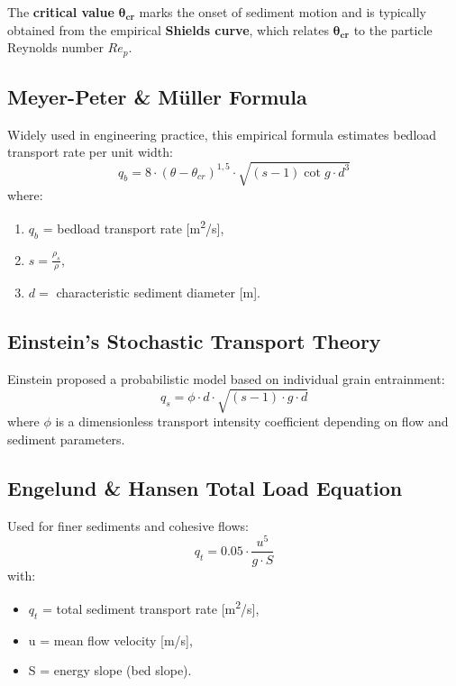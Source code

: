 \documentclass[Journal,letterpaper]{ascelike-new}
\begin{document}
The \textbf{critical value }${\boldsymbol{\theta }}_{\boldsymbol{cr}}$ marks the onset of sediment motion and is typically obtained from the empirical \textbf{Shields curve}, which relates ${\boldsymbol{\theta }}_{\boldsymbol{cr}}$ to the particle Reynolds number ${Re}_p$.


\subsection{Meyer-Peter \& M\"{u}ller Formula \protect\citeyear{meyer-peter1948}}

Widely used in engineering practice, this empirical formula estimates bedload transport rate per unit width:
\[q_b=8\cdot {\left(\theta -{\theta }_{cr}\right)}^{1,5}\cdot \sqrt{\left(s-1\right)\cot g\cdot d^3}\]
where:
\begin{enumerate}
\item  $q_b$ = bedload transport rate [m\textsuperscript{2}/s],

\item  $s=\frac{{\rho }_s}{\rho }$,

\item  $d=$ characteristic sediment diameter [m].
\end{enumerate}


\subsection{Einstein's Stochastic Transport Theory \protect\citeyear{einstein1950}}

Einstein proposed a probabilistic model based on individual grain entrainment:
\[q_s=\phi \cdot d\cdot \sqrt{\left(s-1\right)\cdot g\cdot d}\]
where $\phi $ is a dimensionless transport intensity coefficient depending on flow and sediment parameters.


\subsection{Engelund \& Hansen Total Load Equation \protect\citeyear{engelund1967}}

Used for finer sediments and cohesive flows:
\[q_t=0.05\cdot \frac{u^5}{g\cdot S}\]
with:

\begin{itemize}
\item  $q_t$ = total sediment transport rate [m\textsuperscript{2}/s],

\item  u = mean flow velocity [m/s],

\item  S = energy slope (bed slope).
\end{itemize}
\end{document}

